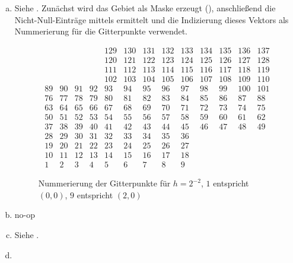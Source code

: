 \documentclass{myexercise}
\begin{document}
\begin{exercise}[Programmieraufgabe]
  \begin{enumerate}[a)]
    \item
      Siehe .
      Zunächst wird das Gebiet als Maske erzeugt (), anschließend die Nicht-Null-Einträge mittels  ermittelt und die Indizierung dieses Vektors als Nummerierung für die Gitterpunkte verwendet.
      \begin{figure}[ht]
        \centering
        \[
          \begin{matrix}
       &     &     &     & 129 & 130 & 131 & 132 & 133 & 134 & 135 & 136 & 137 \\
       &     &     &     & 120 & 121 & 122 & 123 & 124 & 125 & 126 & 127 & 128 \\
       &     &     &     & 111 & 112 & 113 & 114 & 115 & 116 & 117 & 118 & 119 \\
       &     &     &     & 102 & 103 & 104 & 105 & 106 & 107 & 108 & 109 & 110 \\
    89 &  90 &  91 &  92 &  93 &  94 &  95 &  96 &  97 &  98 &  99 & 100 & 101 \\
    76 &  77 &  78 &  79 &  80 &  81 &  82 &  83 &  84 &  85 &  86 &  87 &  88 \\
    63 &  64 &  65 &  66 &  67 &  68 &  69 &  70 &  71 &  72 &  73 &  74 &  75 \\
    50 &  51 &  52 &  53 &  54 &  55 &  56 &  57 &  58 &  59 &  60 &  61 &  62 \\
    37 &  38 &  39 &  40 &  41 &  42 &  43 &  44 &  45 &  46 &  47 &  48 &  49 \\
    28 &  29 &  30 &  31 &  32 &  33 &  34 &  35 &  36 &     &     &     &     \\
    19 &  20 &  21 &  22 &  23 &  24 &  25 &  26 &  27 &     &     &     &     \\
    10 &  11 &  12 &  13 &  14 &  15 &  16 &  17 &  18 &     &     &     &     \\
     1 &   2 &   3 &   4 &   5 &   6 &   7 &   8 &   9 &     &     &     &    
          \end{matrix}
        \]
        \caption{Nummerierung der Gitterpunkte für $h = 2^{-2}$, $1$ entspricht $(0,0)$, $9$ entspricht $(2,0)$}
      \end{figure}
    \item
      no-op
    \item
      Siehe .
    \item

\end{enumerate}
\end{exercise}
\end{document}

